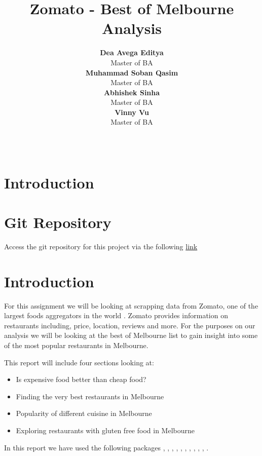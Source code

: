 \documentclass[11pt,a4paper,]{article}
\title{Zomato - Best of Melbourne Analysis}
\author{\sf\Large\textbf{ Dea Avega Editya}\\ {\sf\large Master of BA\\[0.5cm]} \sf\Large\textbf{ Muhammad Soban Qasim}\\ {\sf\large Master of BA\\[0.5cm]} \sf\Large\textbf{ Abhishek Sinha}\\ {\sf\large Master of BA\\[0.5cm]} \sf\Large\textbf{ Vinny Vu}\\ {\sf\large Master of BA\\[0.5cm]}}
\date{\sf\Date~\Month~\Year}
\makeatletter
\providecommand{\tightlist}{%
  \setlength{\itemsep}{0pt}\setlength{\parskip}{0pt}}
\def\titlepage{\front{\expandafter{\@title}}{\@author}{\@organization}}
\makeatother
\begin{document}
\titlepage

{
\setcounter{tocdepth}{2}
\tableofcontents
}
\clearpage

\section*{Introduction}

\hypertarget{git-repository}{%
\section{Git Repository}\label{git-repository}}

Access the git repository for this project via the following \href{https://github.com/dedi0003/assignment4_etc5513}{link}

\hypertarget{introduction}{%
\section{Introduction}\label{introduction}}

For this assignment we will be looking at scrapping data from Zomato, one of the largest foods aggregators in the world \textcite{zomato}. Zomato provides information on restaurants including, price, location, reviews and more. For the purposes on our analysis we will be looking at the best of Melbourne list \textcite{zomatomelb} to gain insight into some of the most popular restaurants in Melbourne.

This report will include four sections looking at:

\begin{itemize}
\tightlist
\item
  Is expensive food better than cheap food?
\item
  Finding the very best restaurants in Melbourne
\item
  Popularity of different cuisine in Melbourne
\item
  Exploring restaurants with gluten free food in Melbourne
\end{itemize}

In this report we have used the following packages \textcite{tidyverse}, \textcite{romato}, \textcite{kableExtra}, \textcite{knitr}, \textcite{dplyr}, \textcite{ggplot2}, \textcite{leaflet}, \textcite{readr}, \textcite{mapview}, \textcite{viridis}, \textcite{plotly}.

\clearpage
\end{document}
